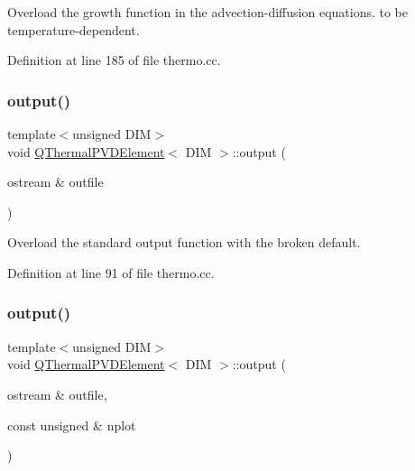 Overload the growth function in the advection-\/diffusion equations. to be temperature-\/dependent. 



Definition at line 185 of file thermo.\+cc.

\mbox{\label{classQThermalPVDElement_a99e482f47a98c1b5ec7ec069211de827}} 
\subsubsection{\texorpdfstring{output()}{output()}\hspace{0.1cm}{\footnotesize\ttfamily [1/4]}}
{\footnotesize\ttfamily template$<$unsigned D\+IM$>$ \\
void \hyperlink{classQThermalPVDElement}{Q\+Thermal\+P\+V\+D\+Element}$<$ D\+IM $>$\+::output (\begin{DoxyParamCaption}\item[{ostream \&}]{outfile }\end{DoxyParamCaption})\hspace{0.3cm}{\ttfamily [inline]}}



Overload the standard output function with the broken default. 



Definition at line 91 of file thermo.\+cc.

\mbox{\label{classQThermalPVDElement_a9d00cc21789124a37dffc9fdf2f011cd}} 
\subsubsection{\texorpdfstring{output()}{output()}\hspace{0.1cm}{\footnotesize\ttfamily [2/4]}}
{\footnotesize\ttfamily template$<$unsigned D\+IM$>$ \\
void \hyperlink{classQThermalPVDElement}{Q\+Thermal\+P\+V\+D\+Element}$<$ D\+IM $>$\+::output (\begin{DoxyParamCaption}\item[{ostream \&}]{outfile,  }\item[{const unsigned \&}]{nplot }\end{DoxyParamCaption})\hspace{0.3cm}{\ttfamily [inline]}}



